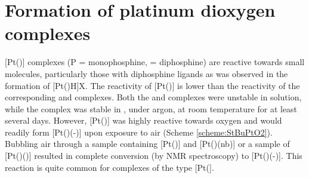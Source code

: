  
\section{Formation of platinum dioxygen complexes}
\label{section:PtO2}

[Pt()] complexes (P = monophosphine,  = diphosphine) are reactive towards small molecules, particularly those with diphosphine ligands as was observed in the formation of [Pt(\tBuxantphos)H]X.\cite{Hackett1988} The reactivity of [Pt(\tButhixantphos)] is lower than the reactivity of the corresponding \tBusixantphos{} and \tBuxantphos{} complexes.  Both the \tBusixantphos{} and \tBuxantphos{} complexes were unstable in solution, while the \tButhixantphos{} complex was stable in , under argon, at room temperature for at least several days.  However, [Pt(\tButhixantphos)] was highly reactive towards oxygen and would readily form [Pt(\tButhixantphos)(-)] upon exposure to air (Scheme \ref{scheme:StBuPtO2}).  Bubbling air through a sample containing [Pt(\tButhixantphos)] and [Pt(\tButhixantphos)(nb)] or a sample of [Pt(\tButhixantphos)()] resulted in complete conversion (by \phosphorus{} NMR spectroscopy) to [Pt(\tButhixantphos)(-)].  This reaction is quite common for complexes of the type [Pt(].\cite{Goel1983b, Yoshida1977}

